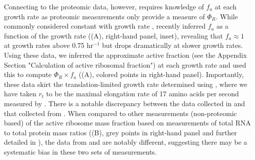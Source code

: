 Connecting  to the proteomic data, however, requires knowledge
of $f_a$ at each growth rate as proteomic measurements only provide a measure of
$\Phi_R$. While commonly considered constant with growth rate \citep{klumpp2013,
bosdriesz2015, kostinski2020}, \cite{dai2016} recently inferred $f_a$ as a
function of the growth rate ((A), right-hand panel, inset),
revealing that $f_a \approx 1$ at growth rates above 0.75 hr$^{-1}$ but drops
dramatically at slower growth rates. Using these data, we inferred the
approximate active fraction (see the Appendix Section "Calculation of active
ribosomal fraction") at each growth rate and used this to compute $\Phi_R \times
f_a$ ((A), colored points in right-hand panel). Importantly,
these data skirt the translation-limited growth rate determined using
, where we have taken $r_t$ to be the maximal elongation rate of
17 amino acids per second measured by \cite{dai2016}. There is a notable
discrepancy between the data collected in \cite{schmidt2016, li2014} and that
collected from \cite{valgepea2013, peebo2015}. When compared to other
measurements (non-proteomic based) of the active ribosome mass fraction based on
measurements of total RNA to total protein mass ratios ((B),
grey points in right-hand panel and  further detailed in
), the data from
\cite{valgepea2013} and \cite{peebo2015} are notably different, suggesting there
may be a systematic bias in these two sets of measurements.


